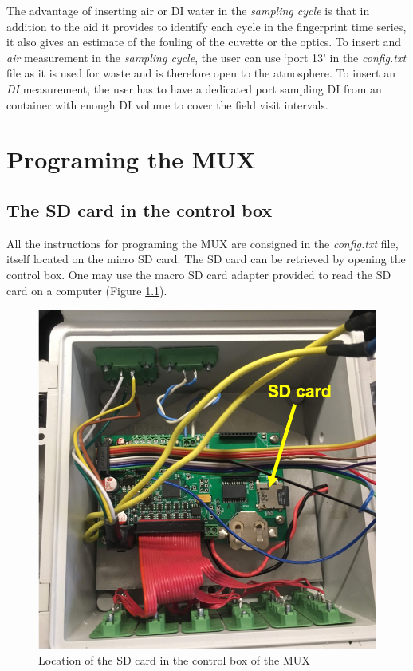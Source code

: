 \documentclass[]{book}
\begin{document}
The advantage of inserting air or DI water in the \emph{sampling cycle} is that in addition to the aid it provides to identify each cycle in the fingerprint time series, it also gives an estimate of the fouling of the cuvette or the optics. To insert and \emph{air} measurement in the \emph{sampling cycle}, the user can use `port 13' in the \emph{config.txt} file as it is used for waste and is therefore open to the atmosphere. To insert an \emph{DI} measurement, the user has to have a dedicated port sampling DI from an container with enough DI volume to cover the field visit intervals.

\hypertarget{programing-the-mux}{%
\chapter{Programing the MUX}\label{programing-the-mux}}

\hypertarget{the-sd-card-in-the-control-box}{%
\section{The SD card in the control box}\label{the-sd-card-in-the-control-box}}

All the instructions for programing the MUX are consigned in the \emph{config.txt} file, itself located on the micro SD card. The SD card can be retrieved by opening the control box. One may use the macro SD card adapter provided to read the SD card on a computer (Figure \ref{fig:ControlBoxSDCard}).

\begin{figure}

{\centering \includegraphics[width=0.7\linewidth]{pictures/ControlBoxSDCard} 

}

\caption{Location of the SD card in the control box of the MUX}\label{fig:ControlBoxSDCard}
\end{figure}
\end{document}

